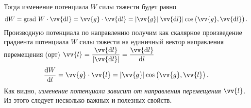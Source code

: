 \documentclass[11pt, a4paper]{article}
\theoremstyle{plain}
\theoremstyle{definition}
\theoremstyle{remark}
\begin{document}
Тогда изменение потенциала $W$ силы тяжести будет равно
\begin{equation*}
    \dif W = \text{grad } W \cdot \vv{\dif l} = \vv{g} \cdot \vv{\dif l} = |\vv{g}| |\vv{\dif l}| \cos \left(\vv{g}, \vv{\dif l}\right).
\end{equation*}
Производную потенциала по направлению получим как скалярное произведение градиента потенциала $W$ силы тяжести на единичный вектор направления перемещения (орт) $\vv{l} = \dfrac{\vv{\dif l}}{|\vv{\dif l}|} = \dfrac{\vv{\dif l}}{\dif l}$
\begin{equation*}
    \dfrac{\dif W}{\dif l} = \vv{g} \cdot \vv{l} = | \vv{g}| \cos \left(\vv{g}, \vv{l}\right).
\end{equation*}
Как видно,\textit{ изменение потенциала зависит от направления перемещения} $\vv{l}$. Из этого следует несколько важных и полезных свойств.
\end{document}
